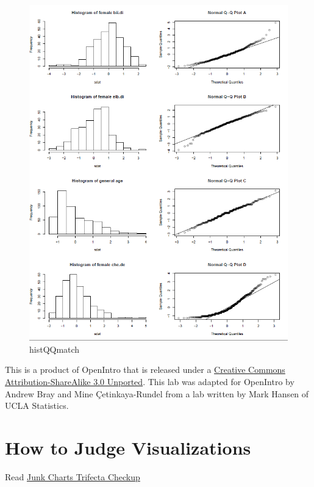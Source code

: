 \documentclass[]{book}
\theoremstyle{definition}
\theoremstyle{definition}
\theoremstyle{remark}
\begin{document}
\begin{figure}[htbp]
\centering
\includegraphics{fig/histQQmatch.png}
\caption{histQQmatch}
\end{figure}

\hypertarget{license}{}
This is a product of OpenIntro that is released under a
\href{http://creativecommons.org/licenses/by-sa/3.0}{Creative Commons
Attribution-ShareAlike 3.0 Unported}. This lab was adapted for OpenIntro
by Andrew Bray and Mine Çetinkaya-Rundel from a lab written by Mark
Hansen of UCLA Statistics.

\hypertarget{trifecta}{\chapter*{How to Judge
Visualizations}\label{trifecta}}

Read
\href{http://junkcharts.typepad.com/junk_charts/junk-charts-trifecta-checkup-the-definitive-guide.html}{Junk
Charts Trifecta Checkup}
\end{document}
